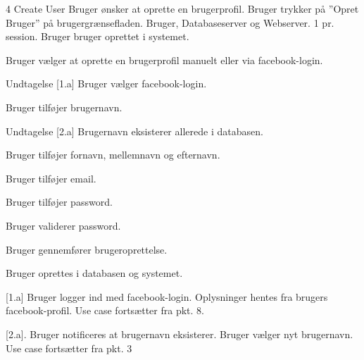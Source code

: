 
\uchead
	{4}
	{Create User}
	{Bruger ønsker at oprette en brugerprofil.}
	{Bruger trykker på ''Opret Bruger'' på brugergrænsefladen.}
	{Bruger, Databaseserver og Webserver.}
	{}
	{1 pr. session.}
	{Bruger bruger oprettet i systemet.}

\item Bruger vælger at oprette en brugerprofil manuelt eller via facebook-login.

\item Undtagelse [1.a] Bruger vælger facebook-login.

\item Bruger tilføjer brugernavn.

\item Undtagelse [2.a] Brugernavn eksisterer allerede i databasen.

\item Bruger tilføjer fornavn, mellemnavn og efternavn.

\item Bruger tilføjer email.

\item Bruger tilføjer password.

\item Bruger validerer password.

\item Bruger gennemfører brugeroprettelse.

\item Bruger oprettes i databasen og systemet.

\ucdescriptionend

\ucextension
	{[1.a]}
	{Bruger logger ind med facebook-login.}
	{Oplysninger hentes fra brugers facebook-profil.}
	{Use case fortsætter fra pkt. 8.}
	
\ucextension
	{[2.a].}
	{Bruger notificeres at brugernavn eksisterer.}
	{Bruger vælger nyt brugernavn.}
	{Use case fortsætter fra pkt. 3}
	
